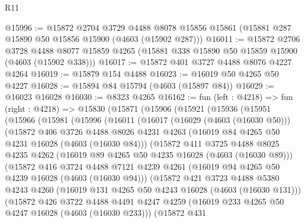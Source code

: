 \begin{lexlean}{R11}
\begin{coremodule}
@15996 := @15872
    @2704
    @3729
    @4488
    @8078
    @15856
    @15861
    (@15881 @287 @15890 @50 @15856 @15900 (@4603 (@15902 @287)))
@16011 := @15872
    @2706
    @3728
    @4488
    @8077
    @15859
    @4265
    (@15881 @338 @15890 @50 @15859 @15900 (@4603 (@15902 @338)))
@16017 := @15872 @401 @3727 @4488 @8076 @4227 @4264
@16019 := @15879 @154 @4488
@16023 := @16019 @50 @4265 @50 @4227
@16028 := @15894 @84 @15794 (@4603 (@15897 @84))
@16029 := @16023 @16028
@16030 := @8323 @4265
@16162 := fun (left : @4218) =>
  fun (right : @4218) =>
  @15830
    (@15871
      (@15906
        (@15921
          (@15936
            (@15951
              (@15966
                (@15981
                  (@15996
                    (@16011
                      (@16017
                        (@16029 (@4603 (@16030 @50)))
                        (@15872
                          @406
                          @3726
                          @4488
                          @8026
                          @4231
                          @4263
                          (@16019 @84 @4265 @50 @4231 @16028 (@4603 (@16030 @84)))
                          (@15872
                            @411
                            @3725
                            @4488
                            @8025
                            @4235
                            @4262
                            (@16019 @89 @4265 @50 @4235 @16028 (@4603 (@16030 @89)))
                            (@15872
                              @416
                              @3724
                              @4488
                              @7121
                              @4239
                              @4261
                              (@16019 @94 @4265 @50 @4239 @16028 (@4603 (@16030 @94)))
                              (@15872
                                @421
                                @3723
                                @4488
                                @5380
                                @4243
                                @4260
                                (@16019 @131 @4265 @50 @4243 @16028 (@4603 (@16030 @131)))
                                (@15872
                                  @426
                                  @3722
                                  @4488
                                  @4491
                                  @4247
                                  @4259
                                  (@16019 @233 @4265 @50 @4247 @16028 (@4603 (@16030 @233)))
                                  (@15872
                                    @431

\end{coremodule}
\end{lexlean}
